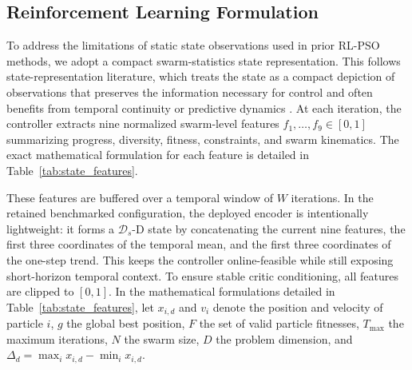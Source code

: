 \documentclass[final,5p,times]{elsarticle}
\newcommand{\symStatedim}{\mathcal{D}_s}
\newcommand{\symPopsize}{N}
\newcommand{\symMaxIters}{T_{\text{max}}}
\newcommand{\symWindowsize}{W}
\begin{document}
\subsection{Reinforcement Learning Formulation}
To address the limitations of static state observations used in prior RL-PSO methods, we adopt a compact swarm-statistics state representation. This follows state-representation literature, which treats the state as a compact depiction of observations that preserves the information necessary for control and often benefits from temporal continuity or predictive dynamics \cite{Lesort2018State}.
At each iteration, the controller extracts nine normalized swarm-level features $f_1, \dots, f_9 \in [0,1]$ summarizing progress, diversity, fitness, constraints, and swarm kinematics. The exact mathematical formulation for each feature is detailed in Table~\ref{tab:state_features}.

These features are buffered over a temporal window of $\symWindowsize$ iterations.
In the retained benchmarked configuration, the deployed encoder is intentionally lightweight: it forms a $\symStatedim$-D state by concatenating the current nine features, the first three coordinates of the temporal mean, and the first three coordinates of the one-step trend.
This keeps the controller online-feasible while still exposing short-horizon temporal context.
To ensure stable critic conditioning, all features are clipped to $[0,1]$.
In the mathematical formulations detailed in Table~\ref{tab:state_features}, let $x_{i,d}$ and $v_{i}$ denote the position and velocity of particle $i$, $g$ the global best position, $F$ the set of valid particle fitnesses, $\symMaxIters$ the maximum iterations, $\symPopsize$ the swarm size, $D$ the problem dimension, and $\Delta_d = \max_i x_{i,d} - \min_i x_{i,d}$.
\end{document}
